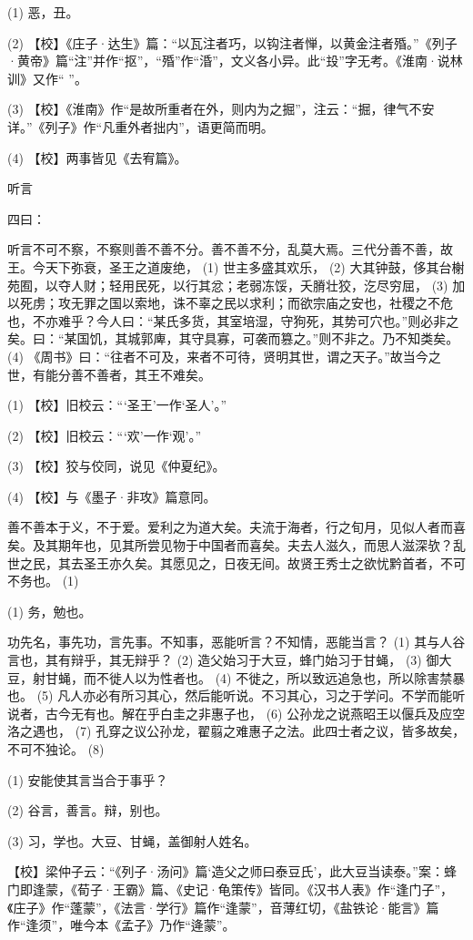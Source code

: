 \documentclass[12pt,UTF8]{ctexbook}
\begin{document}
(1) 恶，丑。

(2) 【校】《庄子·达生》篇：“以瓦注者巧，以钩注者惮，以黄金注者殙。”《列子·黄帝》篇“注”并作“抠”，“殙”作“涽”，文义各小异。此“殶”字无考。《淮南·说林训》又作“ ”。

(3) 【校】《淮南》作“是故所重者在外，则内为之掘”，注云：“掘，律气不安详。”《列子》作“凡重外者拙内”，语更简而明。

(4) 【校】两事皆见《去宥篇》。





听言


四曰：

听言不可不察，不察则善不善不分。善不善不分，乱莫大焉。三代分善不善，故王。今天下弥衰，圣王之道废绝， (1) 世主多盛其欢乐， (2) 大其钟鼓，侈其台榭苑囿，以夺人财；轻用民死，以行其忿；老弱冻馁，夭膌壮狡，汔尽穷屈， (3) 加以死虏；攻无罪之国以索地，诛不辜之民以求利；而欲宗庙之安也，社稷之不危也，不亦难乎？今人曰：“某氏多货，其室培湿，守狗死，其势可穴也。”则必非之矣。曰：“某国饥，其城郭庳，其守具寡，可袭而篡之。”则不非之。乃不知类矣。 (4) 《周书》曰：“往者不可及，来者不可待，贤明其世，谓之天子。”故当今之世，有能分善不善者，其王不难矣。

(1) 【校】旧校云：“‘圣王’一作‘圣人’。”

(2) 【校】旧校云：“‘欢’一作‘观’。”

(3) 【校】狡与佼同，说见《仲夏纪》。

(4) 【校】与《墨子·非攻》篇意同。

善不善本于义，不于爱。爱利之为道大矣。夫流于海者，行之旬月，见似人者而喜矣。及其期年也，见其所尝见物于中国者而喜矣。夫去人滋久，而思人滋深欤？乱世之民，其去圣王亦久矣。其愿见之，日夜无间。故贤王秀士之欲忧黔首者，不可不务也。 (1)

(1) 务，勉也。

功先名，事先功，言先事。不知事，恶能听言？不知情，恶能当言？ (1) 其与人谷言也，其有辩乎，其无辩乎？ (2) 造父始习于大豆，蜂门始习于甘蝇， (3) 御大豆，射甘蝇，而不徙人以为性者也。 (4) 不徙之，所以致远追急也，所以除害禁暴也。 (5) 凡人亦必有所习其心，然后能听说。不习其心，习之于学问。不学而能听说者，古今无有也。解在乎白圭之非惠子也， (6) 公孙龙之说燕昭王以偃兵及应空洛之遇也， (7) 孔穿之议公孙龙，翟翦之难惠子之法。此四士者之议，皆多故矣，不可不独论。 (8)

(1) 安能使其言当合于事乎？

(2) 谷言，善言。辩，别也。

(3) 习，学也。大豆、甘蝇，盖御射人姓名。

【校】梁仲子云：“《列子·汤问》篇‘造父之师曰泰豆氏’，此大豆当读泰。”案：蜂门即逢蒙，《荀子·王霸》篇、《史记·龟策传》皆同。《汉书人表》作“逢门子”，《庄子》作“蓬蒙”，《法言·学行》篇作“逢蒙”，音薄红切，《盐铁论·能言》篇作“逢须”，唯今本《孟子》乃作“逄蒙”。
\end{document}
